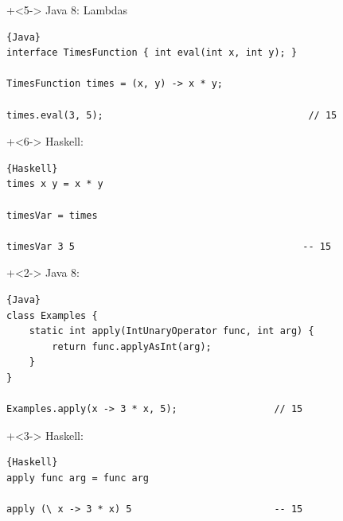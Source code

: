 \begin{frame}[fragile]{}
\onslide+<5->
Java 8: Lambdas 
\begin{lstlisting}{Java}
interface TimesFunction { int eval(int x, int y); }

TimesFunction times = (x, y) -> x * y;

times.eval(3, 5);                                    // 15
\end{lstlisting}
\onslide+<6->
Haskell:
\begin{lstlisting}{Haskell}
times x y = x * y

timesVar = times

timesVar 3 5                                        -- 15
\end{lstlisting}

\end{frame}

\begin{frame}[fragile]{}
\onslide+<2->
Java 8:
\begin{lstlisting}{Java}
class Examples { 
    static int apply(IntUnaryOperator func, int arg) { 
        return func.applyAsInt(arg); 
    }
}

Examples.apply(x -> 3 * x, 5);                 // 15
\end{lstlisting}

\onslide+<3->
Haskell:
\begin{lstlisting}{Haskell}
apply func arg = func arg

apply (\ x -> 3 * x) 5                         -- 15
\end{lstlisting}

\end{frame}

